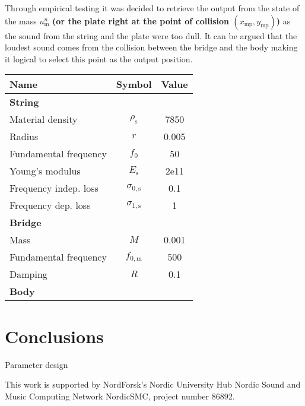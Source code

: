 \documentclass[dvipsnames]{article}
\begin{document}
Through empirical testing it was decided to retrieve the output from the state of the mass $u_\text{m}^n$ \textbf{(or the plate right at the point of collision $(x_\text{mp},y_\text{mp})$)} as the sound from the string and the plate were too dull. It can be argued that the loudest sound comes from the collision between the bridge and the body making it logical to select this point as the output position. 

\begin{tabular}{|l|c|c|}
    \hline
    Name & Symbol & Value\\ \hline
    \multicolumn{3}{|l|}{\bf String}\\ \hline
    Material density & $\rho_\text{s}$ & 7850\\ \hline
    Radius & $r$ & 0.005\\ \hline
    Fundamental frequency & $f_0$ & 50\\ \hline
    Young's modulus & $E_\text{s}$ & 2e11\\ \hline
    Frequency indep. loss & $\sigma_{0,\text{s}}$ & 0.1\\ \hline
    Frequency dep. loss & $\sigma_{1,\text{s}}$ & 1\\ \hline
    \multicolumn{3}{|l|}{\bf Bridge}\\\hline
    Mass & $M$ & 0.001\\ \hline
    Fundamental frequency & $f_{0,\text{m}}$ & 500\\ \hline
    Damping & $R$ & 0.1\\ \hline
    \multicolumn{3}{|l|}{\bf Body}\\ \hline
\end{tabular}

\section{Conclusions}
Parameter design
\begin{acknowledgments}
This work is supported by NordForsk's Nordic
University Hub Nordic Sound and Music Computing Network
NordicSMC, project number 86892.
\end{acknowledgments} 


\end{document}
